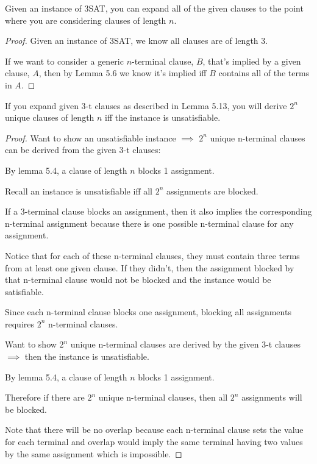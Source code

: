 \documentclass[manuscript]{acmart}
\begin{document}
    \begin{lemma}
        Given an instance of 3SAT, you can expand all of the given clauses to the point where you are considering clauses of length $n$.
    \end{lemma}
    \begin{proof}
        Given an instance of 3SAT, we know all clauses are of length 3.

        If we want to consider a generic $n$-terminal clause, $B$, that's implied by a given clause, $A$, then by Lemma 5.6 we know it's implied iff $B$ contains all of the terms in $A$.
    \end{proof}

    \begin{lemma}
        If you expand given 3-t clauses as described in Lemma 5.13, you will
        derive $2^n$ unique clauses of length $n$ iff the instance is unsatisfiable.
    \end{lemma}
    \begin{proof}
        Want to show an unsatisfiable instance $\implies$ $2^n$ unique n-terminal clauses can be derived from the given 3-t clauses:

        By lemma 5.4, a clause of length $n$ blocks 1 assignment. 

        Recall an instance is unsatisfiable iff all $2^n$ assignments are
        blocked.

        If a 3-terminal clause blocks an assignment, then it also implies
        the corresponding n-terminal assignment because there is one possible n-terminal clause for any assignment.

        Notice that for each of these n-terminal clauses, they must contain
        three terms from at least one given clause. If they didn't, then
        the assignment blocked by that n-terminal clause would not be blocked and the instance would be satisfiable.

        Since each n-terminal clause blocks one assignment, blocking all assignments requires $2^n$ n-terminal clauses.

        Want to show $2^n$ unique n-terminal clauses are derived by the given 3-t clauses $\implies$ then the instance is unsatisfiable.

        By lemma 5.4, a clause of length $n$ blocks 1 assignment. 

        Therefore if there are $2^n$ unique n-terminal clauses, then
        all $2^n$ assignments will be blocked.

        Note that there will be no overlap because each n-terminal clause
        sets the value for each terminal and overlap would imply the same
        terminal having two values by the same assignment which is impossible.
    \end{proof}
\end{document}
